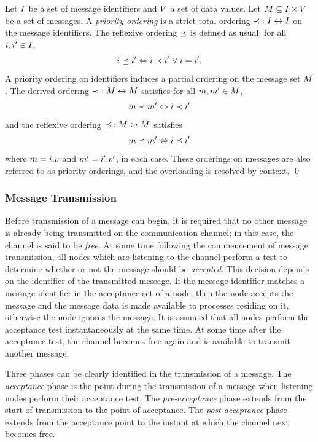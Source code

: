 \begin{definition}
Let $I$ be a set of message identifiers and $V$ a set of data
values.  Let ${M} \subseteq I \times V$ be a set of messages.  A
\emph{priority ordering} is a strict total ordering $\prec\; : I \leftrightarrow I$
on the message identifiers.  The reflexive
ordering $\preceq$\; is defined as usual: for all ${i}, {i}' \in I$,
\[ {i} \preceq {i}' \Leftrightarrow {i} \prec {i}' \mathrel{\vee} {i} = {i}'.\] 
A priority ordering on identifiers induces a partial ordering on the
message set ${M}$. The derived ordering $\prec\; :
{M} \leftrightarrow {M}$ satisfies for all ${m},{m}' \in {M}$,  
\[{m} \prec {m}' \Leftrightarrow {i} \prec {i}'\]
and the reflexive ordering $\preceq\; : {M} \leftrightarrow {M}$ satisfies
\[{m} \preceq {m}' \Leftrightarrow {i} \preceq {i}'\]
where ${m} = {i}.{v}$ and ${m}' = {i}'.{v}'$, in each case. 
These orderings on messages are also referred to as priority orderings, and
the overloading is resolved by context.
\qed
\end{definition}

\subsubsection{Message Transmission}
Before transmission of a message can begin, it is required that no
other message is already being transmitted on the communication
channel; in this case, the channel is said to be \emph{free}. At some
time following the commencement of message transmission, all nodes
which are listening to the channel perform a test to determine whether
or not the message should be \emph{accepted}. This decision depends on
the identifier of the transmitted message. If the message identifier
matches a message identifier in the acceptance set of a node, then
the node accepts the message and the message data is made available
to processes residing on it, otherwise the node ignores the message.
It is assumed that all nodes perform the acceptance test
instantaneously at the same time. At some time after the acceptance
test, the channel becomes free again and is available to transmit
another message.

Three phases can be clearly identified in the transmission of a message.
The \emph{acceptance} phase is the point during the 
transmission of a message when listening nodes perform their acceptance
test. The \emph{pre-acceptance} phase extends from the start of transmission 
to the point of acceptance. The \emph{post-acceptance} phase extends from
the acceptance point to the instant at which the channel next becomes
free. 

